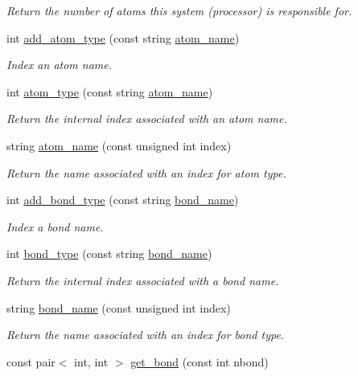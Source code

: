 \begin{DoxyCompactItemize}
\begin{DoxyCompactList}\small\item\em Return the number of atoms this system (processor) is responsible for. \end{DoxyCompactList}\item 
int \hyperlink{classsim__system_1_1System_a27573fa6572cd7ce674256bee90fe42b}{add\-\_\-atom\-\_\-type} (const string \hyperlink{classsim__system_1_1System_a6a8bb930cd772aed838ffd28dbaf908a}{atom\-\_\-name})
\begin{DoxyCompactList}\small\item\em Index an atom name. \end{DoxyCompactList}\item 
int \hyperlink{classsim__system_1_1System_a005e78765fbdf3f941428a2aa2bdbdbc}{atom\-\_\-type} (const string \hyperlink{classsim__system_1_1System_a6a8bb930cd772aed838ffd28dbaf908a}{atom\-\_\-name})
\begin{DoxyCompactList}\small\item\em Return the internal index associated with an atom name. \end{DoxyCompactList}\item 
string \hyperlink{classsim__system_1_1System_a6a8bb930cd772aed838ffd28dbaf908a}{atom\-\_\-name} (const unsigned int index)
\begin{DoxyCompactList}\small\item\em Return the name associated with an index for atom type. \end{DoxyCompactList}\item 
int \hyperlink{classsim__system_1_1System_a6f773418ffbebe0e58b69391b4d4dffa}{add\-\_\-bond\-\_\-type} (const string \hyperlink{classsim__system_1_1System_a8e4b4c847857f38c022296261eff95ea}{bond\-\_\-name})
\begin{DoxyCompactList}\small\item\em Index a bond name. \end{DoxyCompactList}\item 
int \hyperlink{classsim__system_1_1System_a9afead38cb2798024dc2429f88196396}{bond\-\_\-type} (const string \hyperlink{classsim__system_1_1System_a8e4b4c847857f38c022296261eff95ea}{bond\-\_\-name})
\begin{DoxyCompactList}\small\item\em Return the internal index associated with a bond name. \end{DoxyCompactList}\item 
string \hyperlink{classsim__system_1_1System_a8e4b4c847857f38c022296261eff95ea}{bond\-\_\-name} (const unsigned int index)
\begin{DoxyCompactList}\small\item\em Return the name associated with an index for bond type. \end{DoxyCompactList}\item 
\hypertarget{classsim__system_1_1System_ad17d21c84fe750c36353e6c0a268b8cc}{const pair$<$ int, int $>$ \hyperlink{classsim__system_1_1System_ad17d21c84fe750c36353e6c0a268b8cc}{get\-\_\-bond} (const int nbond)}\label{classsim__system_1_1System_ad17d21c84fe750c36353e6c0a268b8cc}


\end{DoxyCompactItemize}
